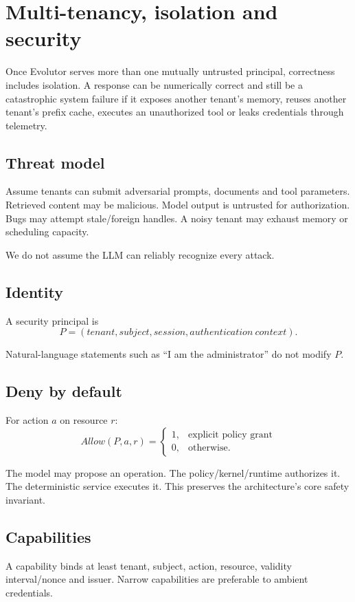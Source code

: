 \chapter{Multi-tenancy, isolation and security}

Once Evolutor serves more than one mutually untrusted principal, correctness includes isolation. A response can be numerically correct and still be a catastrophic system failure if it exposes another tenant's memory, reuses another tenant's prefix cache, executes an unauthorized tool or leaks credentials through telemetry.

\section{Threat model}
Assume tenants can submit adversarial prompts, documents and tool parameters. Retrieved content may be malicious. Model output is untrusted for authorization. Bugs may attempt stale/foreign handles. A noisy tenant may exhaust memory or scheduling capacity.

We do not assume the LLM can reliably recognize every attack.

\section{Identity}
A security principal is
\[
P=(tenant,subject,session,authentication\ context).
\]

Natural-language statements such as ``I am the administrator'' do not modify $P$.

\section{Deny by default}
For action $a$ on resource $r$:
\[
Allow(P,a,r)=
\begin{cases}
1,&\text{explicit policy grant}\\
0,&\text{otherwise}.
\end{cases}
\]

The model may propose an operation. The policy/kernel/runtime authorizes it. The deterministic service executes it. This preserves the architecture's core safety invariant.

\section{Capabilities}
A capability binds at least tenant, subject, action, resource, validity interval/nonce and issuer. Narrow capabilities are preferable to ambient credentials.

